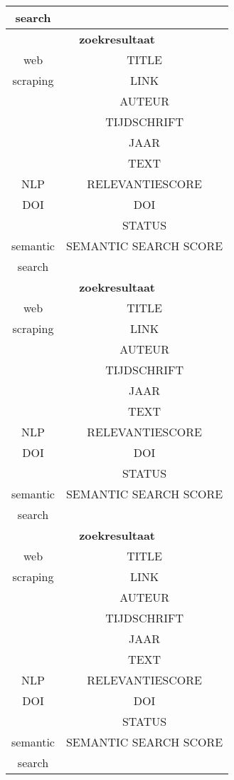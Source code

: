 \begin{table}[h!]
\begin{tabular}{|c|c|}
        search&\\
        \hline
        \multicolumn{2}{|c|}{\textbf{zoekresultaat}} \\
        \hline
        web &TITLE\\
        scraping&LINK\\
        &AUTEUR\\
        &TIJDSCHRIFT\\
        &JAAR\\
        &TEXT\\
        \hline
        NLP&RELEVANTIESCORE\\
        \hline
        DOI&DOI\\
        &STATUS\\
        \hline
        semantic&SEMANTIC SEARCH SCORE\\
        search&\\
        \hline
        \multicolumn{2}{|c|}{\textbf{zoekresultaat}} \\
        \hline
        web &TITLE\\
        scraping&LINK\\
        &AUTEUR\\
        &TIJDSCHRIFT\\
        &JAAR\\
        &TEXT\\
        \hline
        NLP&RELEVANTIESCORE\\
        \hline
        DOI&DOI\\
        &STATUS\\
        \hline
        semantic&SEMANTIC SEARCH SCORE\\
        search&\\
        \hline
        \multicolumn{2}{|c|}{\textbf{zoekresultaat}} \\
        \hline
        web &TITLE\\
        scraping&LINK\\
        &AUTEUR\\
        &TIJDSCHRIFT\\
        &JAAR\\
        &TEXT\\
        \hline
        NLP&RELEVANTIESCORE\\
        \hline
        DOI&DOI\\
        &STATUS\\
        \hline
        semantic&SEMANTIC SEARCH SCORE\\
        search&\\
        \hline
    \end{tabular}
    \label{table:email20250307}
\end{table}
